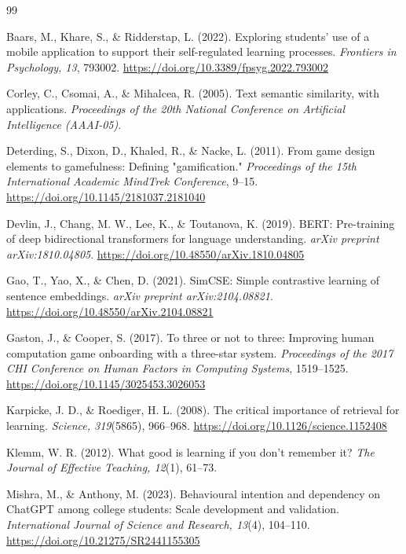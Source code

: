\documentclass[oneside]{um}
\begin{document}
\begin{thebibliography}{99}

 Baars, M., Khare, S., \& Ridderstap, L. (2022). Exploring students' use of a mobile application to support their self-regulated learning processes. \textit{Frontiers in Psychology, 13}, 793002. \url{https://doi.org/10.3389/fpsyg.2022.793002}

 Corley, C., Csomai, A., \& Mihalcea, R. (2005). Text semantic similarity, with applications. \textit{Proceedings of the 20th National Conference on Artificial Intelligence (AAAI-05)}.

 Deterding, S., Dixon, D., Khaled, R., \& Nacke, L. (2011). From game design elements to gamefulness: Defining "gamification." \textit{Proceedings of the 15th International Academic MindTrek Conference}, 9–15. \url{https://doi.org/10.1145/2181037.2181040}

 Devlin, J., Chang, M. W., Lee, K., \& Toutanova, K. (2019). BERT: Pre-training of deep bidirectional transformers for language understanding. \textit{arXiv preprint arXiv:1810.04805}. \url{https://doi.org/10.48550/arXiv.1810.04805}

 Gao, T., Yao, X., \& Chen, D. (2021). SimCSE: Simple contrastive learning of sentence embeddings. \textit{arXiv preprint arXiv:2104.08821}. \url{https://doi.org/10.48550/arXiv.2104.08821}

 Gaston, J., \& Cooper, S. (2017). To three or not to three: Improving human computation game onboarding with a three-star system. \textit{Proceedings of the 2017 CHI Conference on Human Factors in Computing Systems}, 1519–1525. \url{https://doi.org/10.1145/3025453.3026053}

 Karpicke, J. D., \& Roediger, H. L. (2008). The critical importance of retrieval for learning. \textit{Science, 319}(5865), 966–968. \url{https://doi.org/10.1126/science.1152408}

 Klemm, W. R. (2012). What good is learning if you don't remember it? \textit{The Journal of Effective Teaching, 12}(1), 61–73.

 Mishra, M., \& Anthony, M. (2023). Behavioural intention and dependency on ChatGPT among college students: Scale development and validation. \textit{International Journal of Science and Research, 13}(4), 104–110. \url{https://doi.org/10.21275/SR2441155305}


\end{thebibliography}
\end{document}
